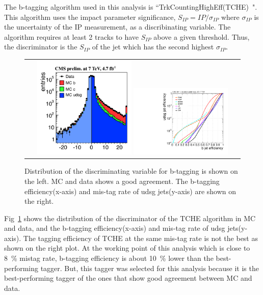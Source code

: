 The b-tagging algorithm used in this analysis is 
``TrkCountingHighEff(TCHE)~\cite{Chatrchyan:1494669}".
This algorithm uses the impact parameter significance, $S_{IP} = IP / \sigma_{IP}$ 
where $\sigma_{IP}$ is the uncertainty of the IP measurement, 
as a discribinating variable. The algorithm requires at least 2 tracks to have $S_{IP}$ 
above a given threshold. Thus, the discriminator is the $S_{IP}$ of the jet 
which has the second highest $\sigma_{IP}$. 

\begin{figure}[htp] 
\centering 
\begin{tabular}{c} 
\includegraphics[width=0.45\textwidth]{figures/TCHE.pdf}
\includegraphics[width=0.45\textwidth]{figures/Figure_007-a.pdf}
\end{tabular} 
\caption{Distribution of the discriminating variable for b-tagging is shown 
on the left. MC and data shows a good agreement.   
The b-tagging efficiency(x-axis) and mis-tag rate of udsg jets(y-axis) 
are shown on the right.}
\label{fig:btagperformance} 
\end{figure} 
Fig~\ref{fig:btagperformance} shows the distribution of the discriminator of the 
TCHE algorithm in MC and data, and 
the b-tagging efficiency(x-axis) and mis-tag rate of udsg jets(y-axis). 
The tagging efficiency of TCHE at the same mis-tag rate is not the best as 
shown on the right plot. At the working point of this analysis which is close 
to 8~\% mistag rate, b-tagging efficiency is about 10~\% lower than the 
best-performing tagger. But, this tagger was selected for this analysis 
because it is the best-performing tagger of the ones that show good agreement 
between MC and data. 
